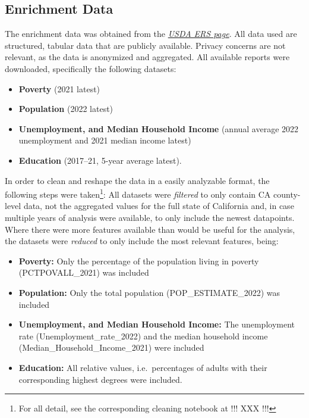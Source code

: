 \subsection{Enrichment Data}\label{subsec:Enrichment_Data}


The enrichment data was obtained from the \textit{\href{https://www.ers.usda.gov/data-products/county-level-data-sets/}{USDA ERS page}}. All data used are structured, tabular data that are publicly available. Privacy concerns are not relevant, as the data is anonymized and aggregated. All available reports were downloaded, specifically the following datasets:

\begin{itemize}
    \item \textbf{Poverty} (2021 latest)
    \item \textbf{Population} (2022 latest)
    \item \textbf{Unemployment, and Median Household Income} (annual average 2022 unemployment and 2021 median income latest)
    \item \textbf{Education} (2017–21, 5-year average latest).
\end{itemize}

In order to clean and reshape the data in a easily analyzable format, the following steps were taken\footnote{For all detail, see the corresponding cleaning notebook at !!! XXX !!!}:
All datasets were \textit{filtered} to only contain CA county-level data, not the aggregated values for the full state of California and, in case multiple years of analysis were available, to only include the newest datapoints. 
Where there were more features available than would be useful for the analysis, the datasets were \textit{reduced} to only include the most relevant features, being:

\begin{itemize}
    \item \textbf{Poverty:} Only the percentage of the population living in poverty (PCTPOVALL\_2021) was included
    \item \textbf{Population:} Only the total population (POP\_ESTIMATE\_2022) was included
    \item \textbf{Unemployment, and Median Household Income:} The unemployment rate (Unemployment\_rate\_2022) and the median household income (Median\_Household\_Income\_2021) were included
    \item \textbf{Education:} All relative values, i.e.\ percentages of adults with their corresponding highest degrees were included.
\end{itemize}

